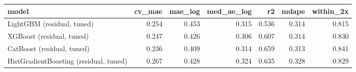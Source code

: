 \begin{tabular}{lrrrrrr}
\toprule
model & cv_mae & mae_log & med_ae_log & r2 & mdape & within_2x \\
\midrule
LightGBM (residual, tuned) & 0.254 & 0.453 & 0.315 & 0.536 & 0.314 & 0.815 \\
XGBoost (residual, tuned) & 0.247 & 0.426 & 0.306 & 0.607 & 0.314 & 0.830 \\
CatBoost (residual, tuned) & 0.236 & 0.409 & 0.314 & 0.659 & 0.313 & 0.841 \\
HistGradientBoosting (residual, tuned) & 0.267 & 0.428 & 0.324 & 0.635 & 0.328 & 0.829 \\
\bottomrule
\end{tabular}
